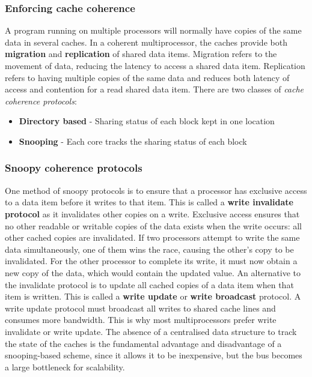 \documentclass[11pt]{article}
\begin{document}
\subsubsection{Enforcing cache coherence}
A program running on multiple processors will normally have copies of the same data in several caches. In a coherent multiprocessor, the caches provide both \textbf{migration} and \textbf{replication} of shared data items. Migration refers to the movement of data, reducing the latency to access a shared data item. Replication refers to having multiple copies of the same data and reduces both latency of access and contention for a read shared data item. 
\n
There are two classes of \textit{cache coherence protocols}:
\begin{itemize}
\item \textbf{Directory based} - Sharing status of each block kept in one location
\item \textbf{Snooping} - Each core tracks the sharing status of each block
\end{itemize}

\subsubsection{Snoopy coherence protocols}
One method of snoopy protocols is to ensure that a processor has exclusive access to a data item before it writes to that item. This is called a \textbf{write invalidate protocol} as it invalidates other copies on a write. Exclusive access ensures that no other readable or writable copies of the data exists when the write occurs: all other cached copies are invalidated. 
\n
If two processors attempt to write the same data simultaneously, one of them wins the race, causing the other's copy to be invalidated. For the other processor to complete its write, it must now obtain a new copy of the data, which would contain the updated value. 
\n
An alternative to the invalidate protocol is to update all cached copies of a data item when that item is written. This is called a \textbf{write update} or \textbf{write broadcast} protocol. A write update protocol must broadcast all writes to shared cache lines and consumes more bandwidth. This is why most multiprocessors prefer write invalidate or write update. The absence of a centralised data structure to track the state of the caches is the fundamental advantage and disadvantage of a snooping-based scheme, since it allows it to be inexpensive, but the bus becomes a large bottleneck for scalability. 
\end{document}
